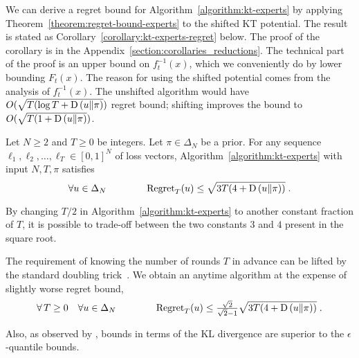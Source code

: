 We can derive a regret bound for Algorithm~\ref{algorithm:kt-experts} by
applying Theorem~\ref{theorem:regret-bound-experts} to the shifted KT potential.
The result is stated as Corollary~\ref{corollary:kt-experts-regret} below. The
proof of the corollary is in the Appendix~\ref{section:corollaries_reductions}.
The technical part of the proof is an upper bound on $f_t^{-1}(x)$, which we
conveniently do by lower bounding $F_t(x)$. The reason for using the shifted
potential comes from the analysis of $f_t^{-1}(x)$. The unshifted algorithm would
have $O(\sqrt{T (\log T + \operatorname*{D}\left({u}\middle\|{\pi}\right)})$ regret bound; shifting improves the
bound to $O(\sqrt{T (1 + \operatorname*{D}\left({u}\middle\|{\pi}\right)})$.

\begin{corollary}
\label{corollary:kt-experts-regret}
Let $N \ge 2$ and $T \ge 0$ be integers. Let $\pi \in \Delta_N$ be a prior.
For any sequence $\ell_1, \ell_2, \dots, \ell_T \in
[0,1]^N$ of loss vectors, Algorithm~\ref{algorithm:kt-experts}
with input $N,T,\pi$ satisfies
$$
\forall u \in \Delta_N \qquad \qquad \operatorname{Regret}_T(u) \le \sqrt{3T (4 + \operatorname*{D}\left({u}\middle\|{\pi}\right))} \; .
$$
\end{corollary}
By changing $T/2$ in Algorithm~\ref{algorithm:kt-experts} to another constant
fraction of $T$, it is possible to trade-off between the two constants $3$ and
$4$ present in the square root.

The requirement of knowing the number of rounds $T$ in advance can be lifted by
the standard doubling trick~\citep[Section 2.3.1]{Shalev-Shwartz12}. We obtain
an anytime algorithm at the expense of slightly worse regret bound,
$$
\forall \, T \ge 0 \quad \forall u \in \Delta_N \qquad \qquad
\operatorname{Regret}_T(u) \le \tfrac{\sqrt{2}}{\sqrt{2} - 1} \sqrt{3T (4 + \operatorname*{D}\left({u}\middle\|{\pi}\right))} \; .
$$

Also, as observed by \citet{ChernovV10}, bounds in terms of the KL
divergence are superior to the $\epsilon$-quantile bounds.
